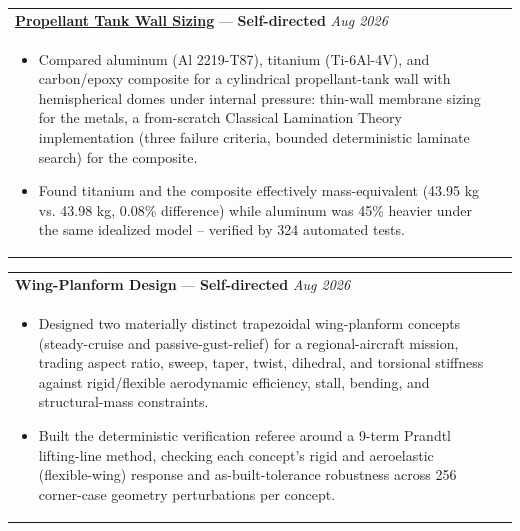 \documentclass[a4paper,8pt]{article}
\newcommand{\ulhref}[2]{%
  {\hypersetup{urlcolor=.}\textcolor{.}{\href{#1}{\uline{#2}}}}%
}
\begin{document}
\begin{tabularx}{\linewidth}{ @{}l r@{} }
\textbf{\ulhref{https://github.com/Sanjanakamboj/propellant-tank-wall-sizing}{Propellant Tank Wall Sizing}} — \color[HTML]{371e77}\textbf{Self-directed} \hfill \textit{Aug 2026}\\[1pt]
\begin{minipage}[t]{\linewidth}
    \begin{itemize}[nosep,after=\strut, leftmargin=*, itemsep=1pt]
        \item Compared aluminum (Al 2219-T87), titanium (Ti-6Al-4V), and carbon/epoxy composite for a cylindrical propellant-tank wall with hemispherical domes under internal pressure: thin-wall membrane sizing for the metals, a from-scratch Classical Lamination Theory implementation (three failure criteria, bounded deterministic laminate search) for the composite.
        \item Found titanium and the composite effectively mass-equivalent (43.95 kg vs. 43.98 kg, 0.08\% difference) while aluminum was 45\% heavier under the same idealized model -- verified by 324 automated tests.
    \end{itemize}
\end{minipage}
\end{tabularx}

\begin{tabularx}{\linewidth}{ @{}l r@{} }
\textbf{Wing-Planform Design} — \color[HTML]{371e77}\textbf{Self-directed} \hfill \textit{Aug 2026}\\[1pt]
\begin{minipage}[t]{\linewidth}
    \begin{itemize}[nosep,after=\strut, leftmargin=*, itemsep=1pt]
        \item Designed two materially distinct trapezoidal wing-planform concepts (steady-cruise and passive-gust-relief) for a regional-aircraft mission, trading aspect ratio, sweep, taper, twist, dihedral, and torsional stiffness against rigid/flexible aerodynamic efficiency, stall, bending, and structural-mass constraints.
        \item Built the deterministic verification referee around a 9-term Prandtl lifting-line method, checking each concept's rigid and aeroelastic (flexible-wing) response and as-built-tolerance robustness across 256 corner-case geometry perturbations per concept.
    \end{itemize}
\end{minipage}
\end{tabularx}
\end{document}
